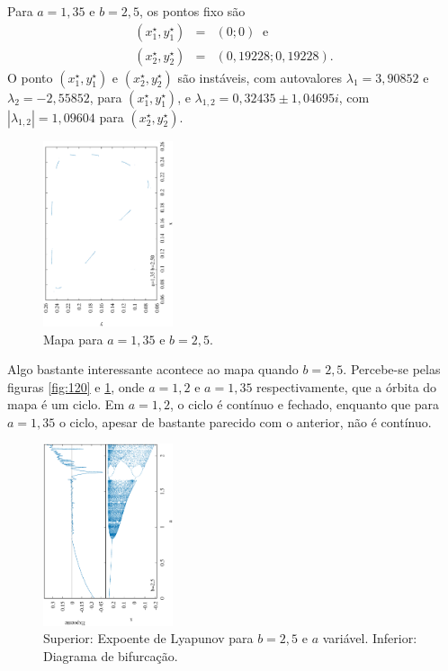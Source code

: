 \documentclass[brazilian, 12pt, a4paper, final]{article}
\begin{document}
\begin{multicols*}{2}
Para $a=1,35$ e $b=2,5$, os pontos fixo são 
\begin{eqnarray}
	\nonumber (x^{\star}_1,y^{\star}_1)&=&(0; 0) \;\; \mathrm{e} \\
	\nonumber (x^{\star}_2,y^{\star}_2)&=&(0,19228; 0,19228).
\end{eqnarray}
O ponto $(x^{\star}_1,y^{\star}_1)$ e $(x^{\star}_2,y^{\star}_2)$ são instáveis, com autovalores $\lambda_1=3,90852$ e $\lambda_2=-2,55852$, para $(x^{\star}_1,y^{\star}_1)$, e $\lambda_{1,2}=0,32435\pm1,04695i$, com $|\lambda_{1,2}|=1,09604
$ para $(x^{\star}_2,y^{\star}_2)$.

\begin{figure}[H] 
  \centering
  \includegraphics[width=0.34\textwidth,angle=-90]{mapa_a135_b250.eps}
  \caption{Mapa para $a=1,35$ e $b=2,5$.}
  \label{fig:135}
\end{figure}

Algo bastante interessante acontece ao mapa quando $b=2,5$. Percebe-se pelas figuras \ref{fig:120} e \ref{fig:135}, onde $a=1,2$ e $a=1,35$ respectivamente, que a órbita do mapa é um ciclo. Em $a=1,2$, o ciclo é contínuo e fechado, enquanto que para $a=1,35$ o ciclo, apesar de bastante parecido com o anterior, não é contínuo.

\begin{figure}[H] 
  \centering
  \includegraphics[width=0.34\textwidth,angle=-90]{lyapunov_a00_b25.eps}
  \caption{Superior: Expoente de Lyapunov para $b=2,5$ e $a$ variável. Inferior: Diagrama de bifurcação.}
  \label{fig:25}
\end{figure}


\end{multicols*}
\end{document}

